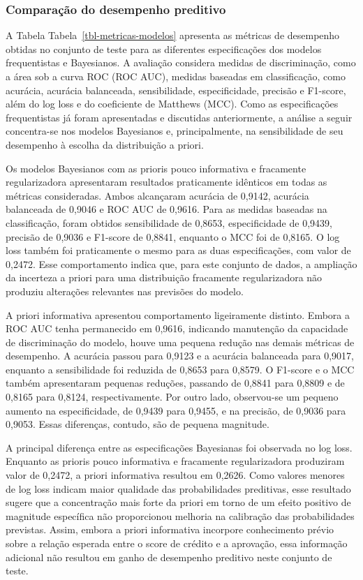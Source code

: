 \documentclass[
  brazilian,
  12pt,
  letterpaper,
  DIV=11,
  numbers=noendperiod]{scrartcl}
\begin{document}
\subsubsection{Comparação do desempenho
preditivo}\label{comparauxe7uxe3o-do-desempenho-preditivo}

A Tabela Tabela~\ref{tbl-metricas-modelos} apresenta as métricas de
desempenho obtidas no conjunto de teste para as diferentes
especificações dos modelos frequentistas e Bayesianos. A avaliação
considera medidas de discriminação, como a área sob a curva ROC (ROC
AUC), medidas baseadas em classificação, como acurácia, acurácia
balanceada, sensibilidade, especificidade, precisão e F1-score, além do
log loss e do coeficiente de Matthews (MCC). Como as especificações
frequentistas já foram apresentadas e discutidas anteriormente, a
análise a seguir concentra-se nos modelos Bayesianos e, principalmente,
na sensibilidade de seu desempenho à escolha da distribuição a priori.

Os modelos Bayesianos com as prioris pouco informativa e fracamente
regularizadora apresentaram resultados praticamente idênticos em todas
as métricas consideradas. Ambos alcançaram acurácia de 0,9142, acurácia
balanceada de 0,9046 e ROC AUC de 0,9616. Para as medidas baseadas na
classificação, foram obtidos sensibilidade de 0,8653, especificidade de
0,9439, precisão de 0,9036 e F1-score de 0,8841, enquanto o MCC foi de
0,8165. O log loss também foi praticamente o mesmo para as duas
especificações, com valor de 0,2472. Esse comportamento indica que, para
este conjunto de dados, a ampliação da incerteza a priori para uma
distribuição fracamente regularizadora não produziu alterações
relevantes nas previsões do modelo.

A priori informativa apresentou comportamento ligeiramente distinto.
Embora a ROC AUC tenha permanecido em 0,9616, indicando manutenção da
capacidade de discriminação do modelo, houve uma pequena redução nas
demais métricas de desempenho. A acurácia passou para 0,9123 e a
acurácia balanceada para 0,9017, enquanto a sensibilidade foi reduzida
de 0,8653 para 0,8579. O F1-score e o MCC também apresentaram pequenas
reduções, passando de 0,8841 para 0,8809 e de 0,8165 para 0,8124,
respectivamente. Por outro lado, observou-se um pequeno aumento na
especificidade, de 0,9439 para 0,9455, e na precisão, de 0,9036 para
0,9053. Essas diferenças, contudo, são de pequena magnitude.

A principal diferença entre as especificações Bayesianas foi observada
no log loss. Enquanto as prioris pouco informativa e fracamente
regularizadora produziram valor de 0,2472, a priori informativa resultou
em 0,2626. Como valores menores de log loss indicam maior qualidade das
probabilidades preditivas, esse resultado sugere que a concentração mais
forte da priori em torno de um efeito positivo de magnitude específica
não proporcionou melhoria na calibração das probabilidades previstas.
Assim, embora a priori informativa incorpore conhecimento prévio sobre a
relação esperada entre o score de crédito e a aprovação, essa informação
adicional não resultou em ganho de desempenho preditivo neste conjunto
de teste.
\end{document}
